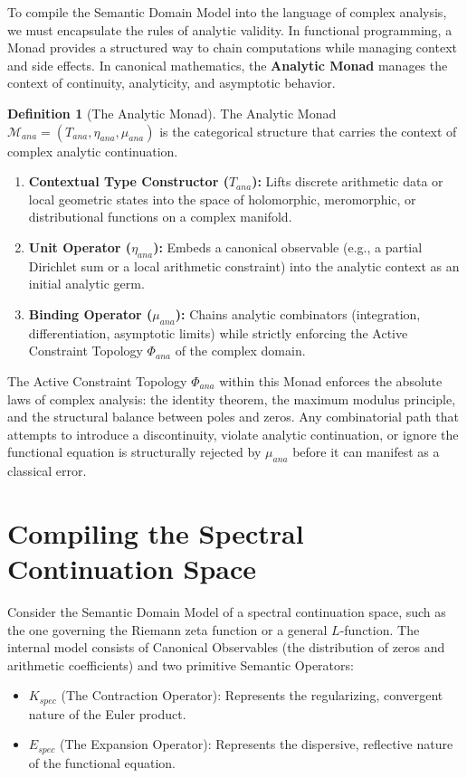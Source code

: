 \documentclass[12pt,openany]{extbook}
\theoremstyle{plain}
\theoremstyle{definition}
\newtheorem{definition}{Definition}[chapter]
\begin{document}
To compile the Semantic Domain Model into the language of complex analysis, we must encapsulate the rules of analytic validity. In functional programming, a Monad provides a structured way to chain computations while managing context and side effects. In canonical mathematics, the \textbf{Analytic Monad} manages the context of continuity, analyticity, and asymptotic behavior.

\begin{definition}[The Analytic Monad]
The Analytic Monad $\mathcal{M}_{ana} = (T_{ana}, \eta_{ana}, \mu_{ana})$ is the categorical structure that carries the context of complex analytic continuation. 
\begin{enumerate}
    \item \textbf{Contextual Type Constructor ($T_{ana}$):} Lifts discrete arithmetic data or local geometric states into the space of holomorphic, meromorphic, or distributional functions on a complex manifold.
    \item \textbf{Unit Operator ($\eta_{ana}$):} Embeds a canonical observable (e.g., a partial Dirichlet sum or a local arithmetic constraint) into the analytic context as an initial analytic germ.
    \item \textbf{Binding Operator ($\mu_{ana}$):} Chains analytic combinators (integration, differentiation, asymptotic limits) while strictly enforcing the Active Constraint Topology $\Phi_{ana}$ of the complex domain.
\end{enumerate}
\end{definition}

The Active Constraint Topology $\Phi_{ana}$ within this Monad enforces the absolute laws of complex analysis: the identity theorem, the maximum modulus principle, and the structural balance between poles and zeros. Any combinatorial path that attempts to introduce a discontinuity, violate analytic continuation, or ignore the functional equation is structurally rejected by $\mu_{ana}$ before it can manifest as a classical error.

\section{Compiling the Spectral Continuation Space}

Consider the Semantic Domain Model of a spectral continuation space, such as the one governing the Riemann zeta function or a general $L$-function. The internal model consists of Canonical Observables (the distribution of zeros and arithmetic coefficients) and two primitive Semantic Operators:
\begin{itemize}
    \item $K_{spec}$ (The Contraction Operator): Represents the regularizing, convergent nature of the Euler product.
    \item $E_{spec}$ (The Expansion Operator): Represents the dispersive, reflective nature of the functional equation.
\end{itemize}
\end{document}
